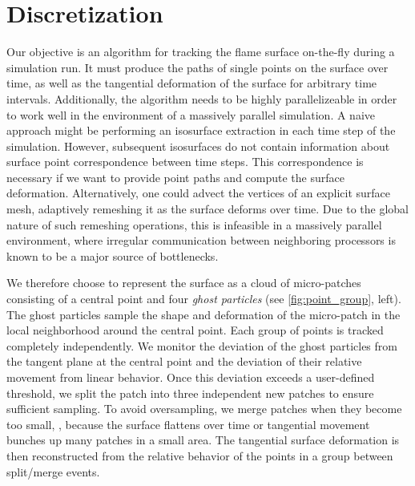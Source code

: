 \section{Discretization} %
\label{sec:fst_discretization}
%
Our objective is an algorithm for tracking the flame surface on-the-fly during
a simulation run.
%
It must produce the paths of single points on the surface over time, as well as
the tangential deformation of the surface for arbitrary time intervals.
%
Additionally, the algorithm needs to be highly parallelizeable in order to work
well in the environment of a massively parallel simulation.
%
A naive approach might be performing an isosurface extraction in each time step
of the simulation.
%
However, subsequent isosurfaces do not contain information about surface point
correspondence between time steps.
%
This correspondence is necessary if we want to provide point paths and compute
the surface deformation.
%
Alternatively, one could advect the vertices of an explicit surface mesh,
adaptively remeshing it as the surface deforms over time.
%
Due to the global nature of such remeshing operations, this is infeasible in a
massively parallel environment, where irregular communication between
neighboring processors is known to be a major source of bottlenecks.
%

%
We therefore choose to represent the surface as a cloud of micro-patches
consisting of a central point and four \textit{ghost particles} (see
\autoref{fig:point_group}, left).
%
The ghost particles sample the shape and deformation of the micro-patch in the
local neighborhood around the central point.
%
Each group of points is tracked completely independently.
%
We monitor the deviation of the ghost particles from the tangent plane at the
central point and the deviation of their relative movement from linear behavior.
%
Once this deviation exceeds a user-defined threshold, we split the patch into
three independent new patches to ensure sufficient sampling.
%
To avoid oversampling, we merge patches when they become too small, \eg, because
the surface flattens over time or tangential movement bunches up
many patches in a small area.
%
The tangential surface deformation is then reconstructed from the relative
behavior of the points in a group between split/merge events.
%

%
